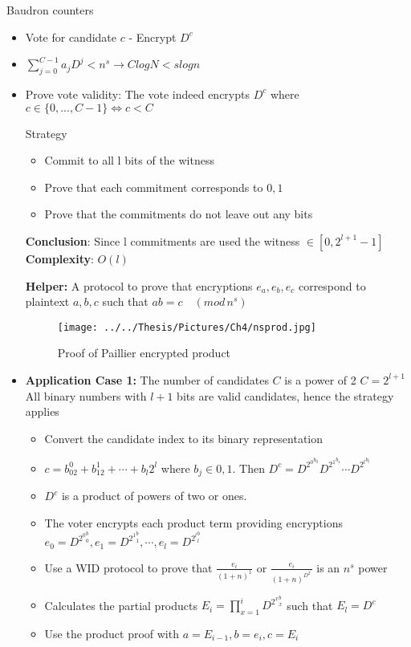 \documentclass{beamer}
\newcommand{\md}[1]{\quad (mod \, {#1})}
\begin{document}
\begin{frame}[allowframebreaks]{Baudron counters}
\begin{itemize}
\item Vote for candidate $c$ - Encrypt $D^c$
\item $\sum_{j=0}^{C-1} a_j D^j < n^s \rightarrow C logN < s logn$
\item Prove vote validity: The vote indeed encrypts $D^c$ where $c \in \{0,...,C-1\}  \Leftrightarrow c < C$

\begin{block}{Strategy}
\begin{itemize}
\item Commit to all l bits of the witness
\item Prove that each commitment corresponds to $0,1$
\item Prove that the commitments do not leave out any bits
\end{itemize}

\textbf{Conclusion}: Since l commitments are used the witness $\in [0,2^{l+1}-1]$
\textbf{Complexity}: $O(l)$

\end{block}

\framebreak 
\textbf{Helper:} A protocol to prove that encryptions $e_a,e_b,e_c$ correspond to plaintext $a,b,c$ such that $ab = c \md{n^s}$
 
\begin{figure}[htbp]
\texttt{[image: ../../Thesis/Pictures/Ch4/nsprod.jpg]} 
\caption{Proof of Paillier encrypted product \cite{Damgard2003}}
\end{figure}

\framebreak

\item \textbf{Application Case 1:} The number of candidates $C$  is a power of 2 $C=2^{l+1}$
All binary numbers with $l+1$ bits are valid candidates, hence the strategy applies
\begin{itemize}
\item Convert the candidate index to its binary representation
\item $c=b_02^0+b_12^1+\cdots+b_l2^l$ where $b_j \in {0,1}$. Then $D^c = D^{{2^0}^{b_0}}D^{{2^1}^{b_1}} \cdots D^{{2^l}^{b_l}}$ 
\item $D^c$ is a product of powers of two or ones. 
\item The voter encrypts each product term providing encryptions $e_0 = D^{{2^0}^b_0}, e_1 = D^{{2^1}^b_1}, \cdots, e_l=D^{{2^l}^b_l}$
\item Use a WID protocol to prove that $\frac{e_i}{(1+n)^1}$ or $\frac{e_i}{(1+n)^{D^{2^i}}}$ is an $n^s$ power 
\item Calculates the partial products $E_i = \prod_{x=1}^i D^{{2^x}^b_x}$ such that $E_l = D^c$
\item Use the product proof with $a=E_{i-1}, b=e_i, c=E_i$ 
\end{itemize}


\end{itemize}
\end{frame}
\end{document}
